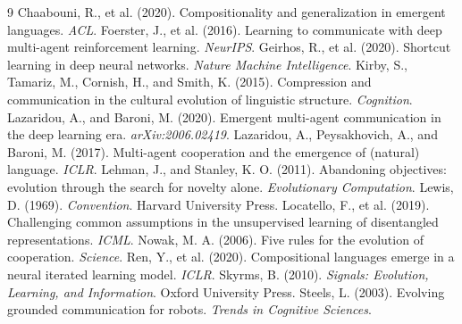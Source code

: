 \documentclass[letterpaper]{article}
\begin{document}
\FloatBarrier
\footnotesize
\begin{thebibliography}{9}
\setlength{\itemsep}{0pt}
 Chaabouni, R., et al. (2020). Compositionality and generalization in emergent languages. \emph{ACL}.
 Foerster, J., et al. (2016). Learning to communicate with deep multi-agent reinforcement learning. \emph{NeurIPS}.
 Geirhos, R., et al. (2020). Shortcut learning in deep neural networks. \emph{Nature Machine Intelligence}.
 Kirby, S., Tamariz, M., Cornish, H., and Smith, K. (2015). Compression and communication in the cultural evolution of linguistic structure. \emph{Cognition}.
 Lazaridou, A., and Baroni, M. (2020). Emergent multi-agent communication in the deep learning era. \emph{arXiv:2006.02419}.
 Lazaridou, A., Peysakhovich, A., and Baroni, M. (2017). Multi-agent cooperation and the emergence of (natural) language. \emph{ICLR}.
 Lehman, J., and Stanley, K. O. (2011). Abandoning objectives: evolution through the search for novelty alone. \emph{Evolutionary Computation}.
 Lewis, D. (1969). \emph{Convention}. Harvard University Press.
 Locatello, F., et al. (2019). Challenging common assumptions in the unsupervised learning of disentangled representations. \emph{ICML}.
 Nowak, M. A. (2006). Five rules for the evolution of cooperation. \emph{Science}.
 Ren, Y., et al. (2020). Compositional languages emerge in a neural iterated learning model. \emph{ICLR}.
 Skyrms, B. (2010). \emph{Signals: Evolution, Learning, and Information}. Oxford University Press.
 Steels, L. (2003). Evolving grounded communication for robots. \emph{Trends in Cognitive Sciences}.
\end{thebibliography}
\end{document}
